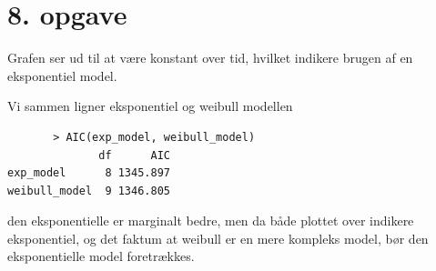 \chapter{8. opgave}
Grafen ser ud til at være konstant over tid, hvilket indikere brugen af en eksponentiel model.

Vi sammen ligner eksponentiel og weibull modellen
\begin{lstlisting}
       > AIC(exp_model, weibull_model)
              df      AIC
exp_model      8 1345.897
weibull_model  9 1346.805 
\end{lstlisting}
den eksponentielle er marginalt bedre, men da både plottet over indikere eksponentiel, og det faktum at weibull er en mere kompleks model, bør den eksponentielle model foretrækkes.